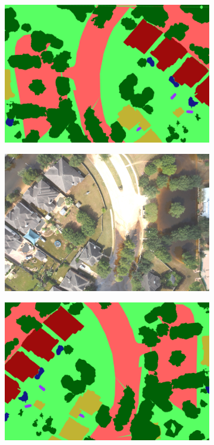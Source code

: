 \begin{figure}[h!]
\begin{subfigure}[b]{0.45\textwidth}
         \centering
         \includegraphics[width=\textwidth]{img/7310_0_lab.png}
         \caption{}
         \label{}
     \end{subfigure}
     \hfill
     \begin{subfigure}[b]{0.45\textwidth}
         \centering
         \includegraphics[width=\textwidth]{img/7310_1.jpg}
         \caption{}
         \label{}
     \end{subfigure}
     \hfill
     \begin{subfigure}[b]{0.45\textwidth}
         \centering
         \includegraphics[width=\textwidth]{img/7310_1_lab.png}

\end{subfigure}
\end{figure}
